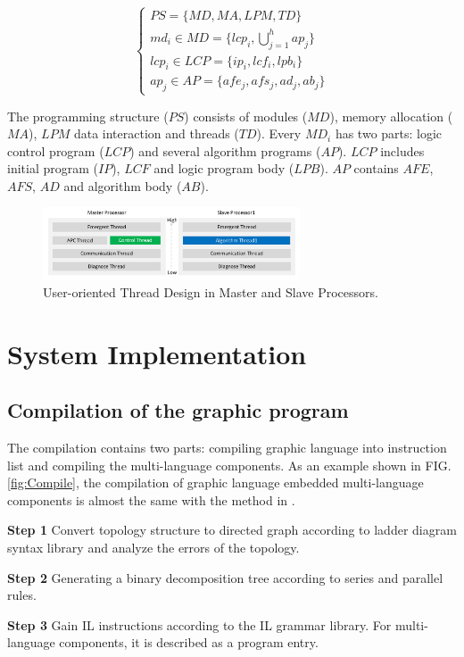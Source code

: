 \documentclass[journal,UTF8]{IEEEtran}
\begin{document}
\begin{equation}
	\left\{
	\begin{array}{l}
	PS = \{MD, MA , LPM, TD\}\\
	md_i \in MD = \{lcp_i, \bigcup_{j=1}^h ap_j\}\\
	lcp_i \in LCP = \{ip_i, lcf_i, lpb_i\}\\
	ap_j \in AP = \{afe_j, afs_j, ad_j, ab_j\}
	\end{array}
	\right.
	\end{equation}

The programming structure ($PS$) consists of modules ($MD$), memory allocation ($MA$), $LPM$ data interaction and threads ($TD$). Every $MD_i$ has two parts: logic control program ($LCP$) and several algorithm programs ($AP$). $LCP$ includes initial program ($IP$), $LCF$ and logic program body ($LPB$). $AP$ contains $AFE$, $AFS$, $AD$ and algorithm body ($AB$).

\begin{figure}
	\centering
	\includegraphics[width=3in]{fig/FIG5.pdf}
	\caption{ User-oriented Thread Design in Master and Slave Processors.}
	\label{fig:Threads}
\end{figure}
 \section{System Implementation}
 \label{Process}
 \subsection{Compilation of the graphic program}
 The compilation contains two parts: compiling graphic language into instruction list and compiling the multi-language components. As an example shown in FIG. \ref{fig:Compile}, the compilation of graphic language embedded multi-language components is almost the same with the method in \cite{Yan2010Compiling}.
 	
 \textbf{Step 1} Convert topology structure to directed graph according to ladder diagram syntax library and analyze the errors of the topology.
 	
 \textbf{Step 2} Generating a binary decomposition tree according to series and parallel rules.
 	
 \textbf{Step 3} Gain IL instructions according to the IL grammar library. For multi-language components, it is described as a program entry.
 
\end{document}
